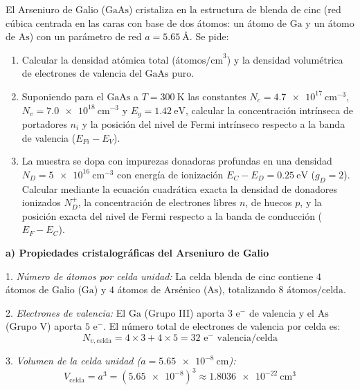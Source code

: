 \newpage
\begin{problema}
El Arseniuro de Galio ($\text{GaAs}$) cristaliza en la estructura de blenda de cinc (red cúbica centrada en las caras con base de dos átomos: un átomo de $\text{Ga}$ y un átomo de $\text{As}$) con un parámetro de red $a = \SI{5.65}{\text{\AA}}$. Se pide:

\begin{enumerate}[label=\alph*)]
    \item Calcular la densidad atómica total ($\text{átomos/cm}^3$) y la densidad volumétrica de electrones de valencia del $\text{GaAs}$ puro.
    \item Suponiendo para el $\text{GaAs}$ a $T = \SI{300}{\kelvin}$ las constantes $N_c = \SI{4.7e17}{\cm^{-3}}$, $N_v = \SI{7.0e18}{\cm^{-3}}$ y $E_g = \SI{1.42}{\eV}$, calcular la concentración intrínseca de portadores $n_i$ y la posición del nivel de Fermi intrínseco respecto a la banda de valencia ($E_{Fi} - E_V$).
    \item La muestra se dopa con impurezas donadoras profundas en una densidad $N_D = \SI{5e16}{\cm^{-3}}$ con energía de ionización $E_C - E_D = \SI{0.25}{\eV}$ ($g_D = 2$). Calcular mediante la ecuación cuadrática exacta la densidad de donadores ionizados $N_D^+$, la concentración de electrones libres $n$, de huecos $p$, y la posición exacta del nivel de Fermi respecto a la banda de conducción ($E_F - E_C$).
\end{enumerate}

\tcblower

\textbf{a) Propiedades cristalográficas del Arseniuro de Galio}

1. \textit{Número de átomos por celda unidad:}
La celda blenda de cinc contiene $4$ átomos de Galio ($\text{Ga}$) y $4$ átomos de Arsénico ($\text{As}$), totalizando $8 \text{ átomos/celda}$.

2. \textit{Electrones de valencia:}
El $\text{Ga}$ (Grupo III) aporta $3 \text{ e}^-$ de valencia y el $\text{As}$ (Grupo V) aporta $5 \text{ e}^-$. El número total de electrones de valencia por celda es:
\[
N_{v,\text{celda}} = 4 \times 3 + 4 \times 5 = 32 \text{ e}^-\text{ valencia/celda}
\]

3. \textit{Volumen de la celda unidad ($a = \SI{5.65e-8}{\cm}$):}
\[
V_{\text{celda}} = a^3 = (\num{5.65e-8})^3 \approx \SI{1.8036e-22}{\cm^3}
\]


\end{problema}
